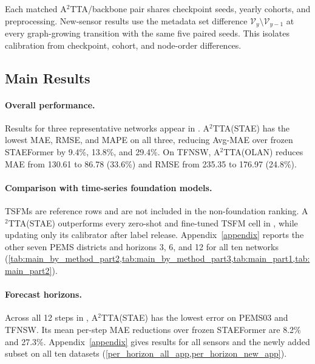 Each matched A$^2$TTA/backbone pair shares checkpoint seeds, yearly cohorts,
and preprocessing. New-sensor results use the metadata set difference
$\mathcal V_y\setminus\mathcal V_{y-1}$ at every graph-growing transition
with the same five paired seeds. This isolates calibration from checkpoint,
cohort, and node-order differences.

\subsection{Main Results}



\paragraph{Overall performance.}
Results for three representative networks appear in
.
A$^2$TTA(STAE) has the lowest MAE, RMSE, and MAPE on all three, reducing
Avg-MAE over frozen STAEFormer by 9.4\%, 13.8\%, and 29.4\%. On TFNSW,
A$^2$TTA(OLAN) reduces MAE from 130.61 to 86.78 (33.6\%) and RMSE from
235.35 to 176.97 (24.8\%).

\paragraph{Comparison with time-series foundation models.}
TSFMs are reference rows and are not included in the non-foundation ranking.
A$^2$TTA(STAE) outperforms every zero-shot and fine-tuned TSFM cell in
, while updating only its calibrator after
label release. Appendix~\ref{appendix} reports the other seven PEMS districts
and horizons 3, 6, and 12 for all ten networks
(\cref{tab:main_by_method_part2,tab:main_by_method_part3,tab:main_part1,tab:main_part2}).


% 
% 



\paragraph{Forecast horizons.}
Across all 12 steps in , A$^2$TTA(STAE) has the lowest error
on PEMS03 and TFNSW. Its mean per-step MAE reductions over frozen STAEFormer
are 8.2\% and 27.3\%. Appendix~\ref{appendix} gives results for all sensors and
the newly added subset on all ten datasets
(\cref{per_horizon_all_app,per_horizon_new_app}).
% 
% 

